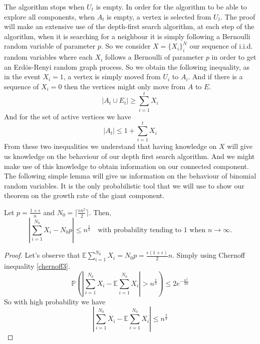 The algorithm stops when $U_t$ is empty.
\newline
In order for the algorithm to be able to explore all components, when $A_t$ is empty, a vertex is selected from $U_t$.
\newline
The proof will make an extensive use of the depth-first search algorithm, at each step of the algorithm, when it is searching for a neighbour it is simply following a Bernoulli random variable of parameter $p$.
So we consider $X = \{X_i\}_i^N$ our sequence of i.i.d. random variables where each $X_i$ follows a Bernoulli of parameter $p$ in order to get an Erd\"os-Renyi random graph process.
So we obtain the following inequality, as in the event $X_i = 1$, a vertex is simply moved from $U_i$ to $A_i$. And if there is a sequence of $X_i = 0$ then the vertices might only move from $A$ to $E$.  
\begin{equation}
	|A_t \cup E_t| \geq \sum_{i=1}^t X_i
\end{equation} 
And for the set of active vertices we have
\begin{equation}\label{eq:At}
	|A_t| \leq 1 + \sum_{i=1}^t X_i
\end{equation}
From these two inequalities we understand that having knowledge on $X$ will give us knowledge on the behaviour of our depth first search algorithm. And we might make use of this knowledge to obtain information on our connected component.
\newline
The following simple lemma will give us information on the behaviour of binomial random variables. It is the only probabilistic tool that we will use to show our theorem on the growth rate of the giant component.
\begin{lemma}\label{lemmaN0}
	Let $p = \frac{1+\epsilon}{n}$ and $N_0 = \lceil\frac{\epsilon n^2}{2}\rceil$. Then, 
	\begin{equation}
	|\sum_{i=1}^{N_0} X_{i} - N_0 p| \leq n^{\frac{2}{3}} \quad \text{with probability tending to 1 when $n\to \infty$.}
	\end{equation}
\end{lemma}
\begin{proof}
	Let's observe that $\mathbb{E}\sum_{i=1}^{N_0} X_i = N_0 p = \frac{\epsilon(1+\epsilon)}{2}n$.
	Simply using Chernoff inequality \eqref{chernoff3}.
	\begin{equation}
		\mathbb{P}(|\sum_{i=1}^{N_0} X_i - \mathbb{E}\sum_{i=1}^{N_0} X_i| > n^{\frac{2}{3}} ) \leq 2 e^{-\frac{n^{\frac{4}{3}}}{2n}}
	\end{equation}
	So with high probability we have 
	\begin{equation}
		|\sum_{i=1}^{N_0} X_i - \mathbb{E}\sum_{i=1}^{N_0} X_i| \leq n^{\frac{2}{3}}
	\end{equation}
\end{proof}
